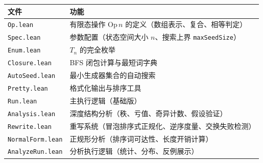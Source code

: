 \begin{center}
\begin{tabular}{l|p{9cm}}
\toprule
文件 & 功能 \\
\midrule
\texttt{Op.lean} & 有限态操作 $\mathrm{Op}\,n$ 的定义（数组表示、复合、相等判定）\\
\texttt{Spec.lean} & 参数配置（状态空间大小 $n$、搜索上界 \texttt{maxSeedSize}）\\
\texttt{Enum.lean} & $T_n$ 的完全枚举 \\
\texttt{Closure.lean} & BFS 闭包计算与最短词字典 \\
\texttt{AutoSeed.lean} & 最小生成器集合的自动搜索 \\
\texttt{Pretty.lean} & 格式化输出与排序工具 \\
\texttt{Run.lean} & 主执行逻辑（基础版） \\
\texttt{Analysis.lean} & 深度结构分析（秩、亏值、奇异计数、假设验证）\\
\texttt{Rewrite.lean} & 重写系统（冒泡排序式正规化、逆序度量、交换失败检测）\\
\texttt{NormalForm.lean} & 正规形分析（排序词可达性、长度开销计算）\\
\texttt{AnalyzeRun.lean} & 分析执行逻辑（统计、分布、反例展示）\\
\bottomrule
\end{tabular}
\end{center}
